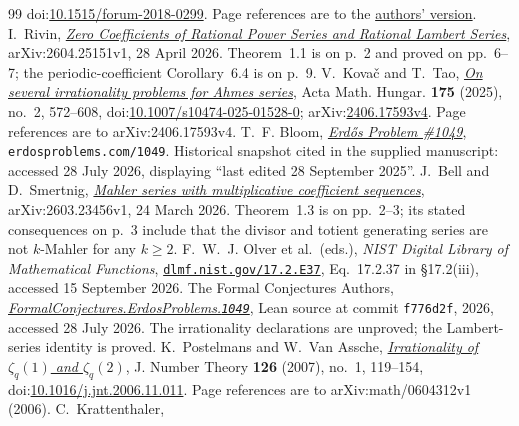 \begin{thebibliography}{99}
  doi:\href{https://doi.org/10.1515/forum-2018-0299}{10.1515/forum-2018-0299}.
  Page references are to the
  \href{https://danielduverney.fr/documents/theorie-des-nombres/DuverneyTachiya190522.pdf}{authors'
  version}.
 I.~Rivin,
\href{https://arxiv.org/abs/2604.25151v1}{\emph{Zero Coefficients of Rational
  Power Series and Rational Lambert Series}}, arXiv:2604.25151v1,
  28 April 2026.
  Theorem~1.1 is on p.~2 and proved on pp.~6--7; the periodic-coefficient
  Corollary~6.4 is on p.~9.
 V.~Kova\v{c} and T.~Tao,
  \href{https://arxiv.org/abs/2406.17593v4}{\emph{On several irrationality
  problems for Ahmes series}}, Acta Math. Hungar. \textbf{175} (2025), no.~2,
  572--608,
  doi:\href{https://doi.org/10.1007/s10474-025-01528-0}{10.1007/s10474-025-01528-0};
  arXiv:\href{https://arxiv.org/abs/2406.17593v4}{2406.17593v4}.
  Page references are to arXiv:2406.17593v4.
 T.~F. Bloom,
  \href{https://www.erdosproblems.com/1049}{\emph{Erd\H{o}s Problem \#1049}},
  \texttt{erdosproblems.com/1049}. Historical snapshot cited in the supplied
  manuscript: accessed 28 July 2026, displaying ``last edited
  28 September 2025''.
 J.~Bell and D.~Smertnig,
  \href{https://arxiv.org/abs/2603.23456v1}{\emph{Mahler series with
  multiplicative coefficient sequences}}, arXiv:2603.23456v1,
  24 March 2026.  Theorem~1.3 is on pp.~2--3; its stated consequences on
  p.~3 include that the divisor and totient generating series are not
  $k$-Mahler for any $k\ge2$.
 F.~W.~J. Olver et al.\ (eds.), \emph{NIST Digital Library of
  Mathematical Functions},
  \href{https://dlmf.nist.gov/17.2.E37}{\texttt{dlmf.nist.gov/17.2.E37}},
  Eq.~17.2.37 in \S17.2(iii), accessed 15 September 2026.
 The Formal Conjectures Authors,
  \href{https://github.com/google-deepmind/formal-conjectures/blob/f776d2f2039351b00737ffcafb9d7d7666e1d9af/FormalConjectures/ErdosProblems/1049.lean}
  {\emph{FormalConjectures.ErdosProblems.\texttt{1049}}},
  Lean source at commit \texttt{f776d2f}, 2026, accessed 28 July 2026.  The
  irrationality declarations are unproved; the Lambert-series identity is
  proved.
 K.~Postelmans and W.~Van Assche,
  \href{https://arxiv.org/abs/math/0604312v1}{\emph{Irrationality of
  $\zeta_q(1)$ and $\zeta_q(2)$}}, J. Number Theory \textbf{126} (2007),
  no.~1, 119--154,
  doi:\href{https://doi.org/10.1016/j.jnt.2006.11.011}{10.1016/j.jnt.2006.11.011}.
  Page references are to arXiv:math/0604312v1 (2006).
 C.~Krattenthaler,

\end{thebibliography}
